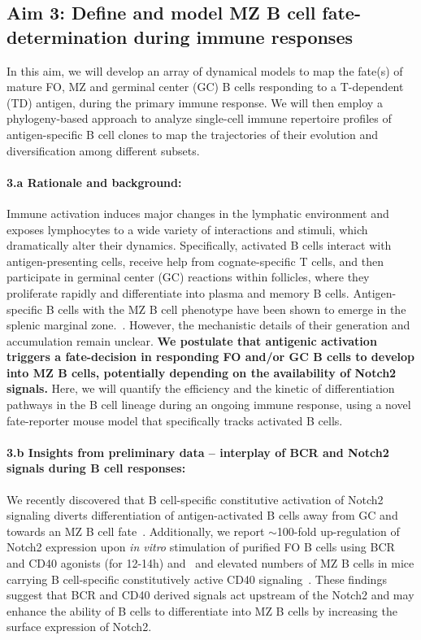 \documentclass[11pt]{article}
\newcommand{\para}[1]{\vspace*{-4.5mm}\paragraph{#1}}
\begin{document}
\subsection*{Aim 3: Define and model MZ B cell fate-determination during immune responses}
\vspace*{-1mm}
In this aim, we will develop an array of dynamical models to map the fate(s) of mature FO, MZ and germinal center (GC) B cells responding to a T-dependent (TD) antigen, during the primary immune response.
We will then employ a phylogeny-based approach to analyze single-cell immune repertoire profiles of antigen-specific B cell clones to map the trajectories of their evolution and diversification among different subsets. 


\para{{3.a Rationale and background:}}
Immune activation induces major changes in the lymphatic environment and exposes lymphocytes to a wide variety of interactions and stimuli, which dramatically alter their dynamics. 
Specifically, activated B cells interact with antigen-presenting cells, receive help from cognate-specific T cells, and then participate in germinal center (GC) reactions within follicles, where they proliferate rapidly and differentiate into plasma and memory B cells. 
Antigen-specific B cells with the MZ B cell phenotype have been shown to emerge in the splenic marginal zone.~\cite{Liu_1988, Yang_Shih_2002}.
However, the mechanistic details of their generation and accumulation remain unclear.
\textbf{We postulate that antigenic activation triggers a fate-decision in responding FO and/or GC B cells to develop into MZ B cells, potentially depending on the availability of Notch2 signals. }
Here, we will quantify the efficiency and the kinetic of differentiation pathways in the B cell lineage during an ongoing immune response, using a novel fate-reporter mouse model that specifically tracks activated B cells.


\para{{3.b Insights from preliminary data -- interplay of BCR and Notch2 signals during B cell responses:}}
We recently discovered that B cell-specific constitutive activation of Notch2 signaling diverts differentiation of antigen-activated B cells away from GC and towards an MZ B cell fate~\cite{Babushku:2022}.
Additionally, we report $\sim$100-fold up-regulation of Notch2 expression upon \textit{in vitro} stimulation of purified FO B cells using BCR and CD40 agonists (for 12-14h)  and~\cite{Babushku:2022} and elevated numbers of MZ B cells in mice carrying B cell-specific constitutively active CD40 signaling~\cite{Homig_Holzel_2008}.
These findings suggest that {BCR and CD40 derived signals act upstream of the Notch2} and may enhance the ability of B cells to differentiate into MZ B cells by increasing the surface expression of Notch2.
\end{document}
